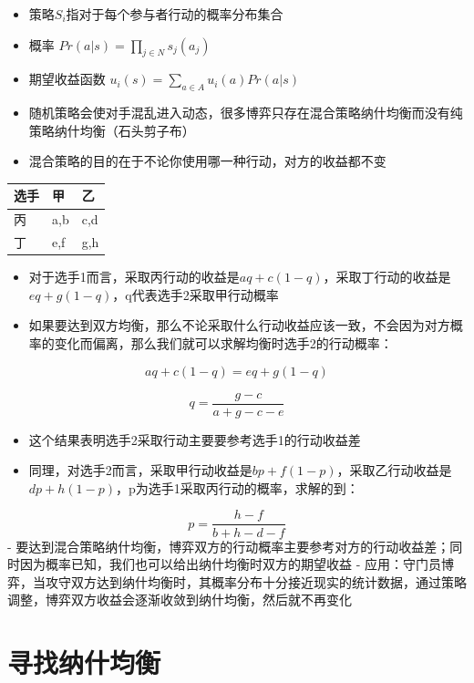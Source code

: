 \documentclass[]{book}
\providecommand{\tightlist}{%
  \setlength{\itemsep}{0pt}\setlength{\parskip}{0pt}}
\begin{document}
\begin{itemize}
\tightlist
\item
  策略\(S_i\)指对于每个参与者行动的概率分布集合
\item
  概率 \(Pr(a|s) = \prod_{j \in N}s_j(a_j)\)
\item
  期望收益函数 \(u_i(s) = \sum_{a \in A} u_i(a)Pr(a|s)\)
\item
  随机策略会使对手混乱进入动态，很多博弈只存在混合策略纳什均衡而没有纯策略纳什均衡（石头剪子布）
\item
  混合策略的目的在于不论你使用哪一种行动，对方的收益都不变
\end{itemize}

\begin{longtable}[]{@{}lll@{}}
\toprule
选手 & 甲 & 乙\tabularnewline
\midrule
\endhead
丙 & a,b & c,d\tabularnewline
丁 & e,f & g,h\tabularnewline
\bottomrule
\end{longtable}

\begin{itemize}
\tightlist
\item
  对于选手1而言，采取丙行动的收益是\(aq+c(1-q)\)，采取丁行动的收益是\(eq+g(1-q)\)，q代表选手2采取甲行动概率
\item
  如果要达到双方均衡，那么不论采取什么行动收益应该一致，不会因为对方概率的变化而偏离，那么我们就可以求解均衡时选手2的行动概率：
\end{itemize}

\[aq+c(1-q) = eq+g(1-q)\]

\[q = \frac{g-c}{a+g-c-e}\]

\begin{itemize}
\tightlist
\item
  这个结果表明选手2采取行动主要要参考选手1的行动收益差
\item
  同理，对选手2而言，采取甲行动收益是\(bp+f(1-p)\)，采取乙行动收益是\(dp+h(1-p)\)，p为选手1采取丙行动的概率，求解的到：
\end{itemize}

\[p=\frac{h-f}{b+h-d-f}\]
- 要达到混合策略纳什均衡，博弈双方的行动概率主要参考对方的行动收益差；同时因为概率已知，我们也可以给出纳什均衡时双方的期望收益
- 应用：守门员博弈，当攻守双方达到纳什均衡时，其概率分布十分接近现实的统计数据，通过策略调整，博弈双方收益会逐渐收敛到纳什均衡，然后就不再变化

\section{寻找纳什均衡}
\end{document}
